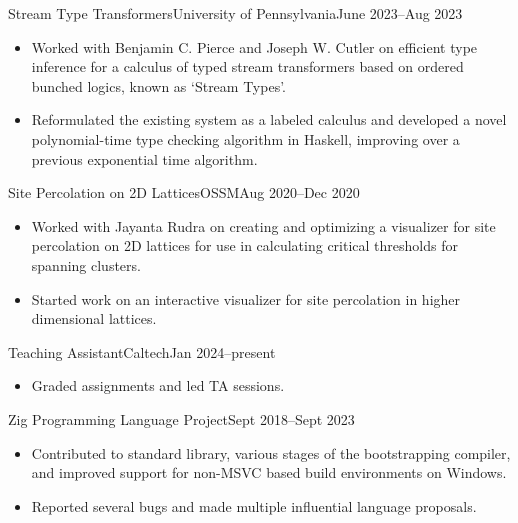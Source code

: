 \documentclass[a4paper]{article}
\begin{document}
    \begin{activity*}{Stream Type Transformers}{University of Pennsylvania}{June 2023--Aug 2023}
      \begin{itemize}[topsep=5pt, partopsep=0pt, itemsep=-1pt]
        \item Worked with Benjamin C. Pierce and Joseph W. Cutler on efficient type inference for a calculus of typed stream transformers based on ordered bunched logics, known as `Stream Types'.
        \item Reformulated the existing system as a labeled calculus and developed a novel polynomial-time type checking algorithm in Haskell, improving over a previous exponential time algorithm.
      \end{itemize}
    \end{activity*}

    \begin{activity*}{Site Percolation on 2D Lattices}{OSSM}{Aug 2020--Dec 2020}
      \begin{itemize}[topsep=5pt, partopsep=0pt, itemsep=-1pt]
        \item Worked with Jayanta Rudra on creating and optimizing a visualizer for site percolation on 2D lattices for use in calculating critical thresholds for spanning clusters.
        \item Started work on an interactive visualizer for site percolation in higher dimensional lattices.
      \end{itemize}
    \end{activity*}

    \begin{activity*}{Teaching Assistant}{Caltech}{Jan 2024--present}
      \begin{itemize}[topsep=5pt, partopsep=0pt, itemsep=-1pt]
        \item Graded assignments and led TA sessions.
      \end{itemize}
    \end{activity*}

    \begin{activity}{Zig Programming Language Project}{Sept 2018--Sept 2023}
      \begin{itemize}[topsep=5pt, partopsep=0pt, itemsep=-1pt]
        \item Contributed to standard library, various stages of the bootstrapping compiler, and improved support for non-MSVC based build environments on Windows.
        \item Reported several bugs and made multiple influential language proposals.
      \end{itemize}
    \end{activity}
\end{document}
